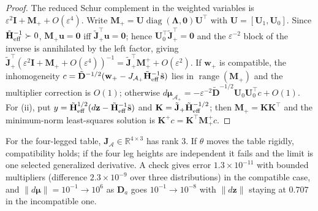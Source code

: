 \begin{proof}
The reduced Schur complement in the weighted variables is $\varepsilon^2\mathbf I+\mathbf M_++O(\varepsilon^4)$. Write $\mathbf M_+=\mathbf U\operatorname{diag}(\boldsymbol\Lambda,\mathbf 0)\mathbf U^\top$ with $\mathbf U=[\mathbf U_1,\mathbf U_0]$. Since $\tilde{\mathbf H}_{\rm eff}^{-1}\succ0$, $\mathbf M_+\mathbf u=\mathbf 0$ iff $\tilde{\mathbf J}_+^\top\mathbf u=\mathbf 0$; hence $\mathbf U_0^\top\tilde{\mathbf J}_+^\top=\mathbf 0$ and the $\varepsilon^{-2}$ block of the inverse is annihilated by the left factor, giving $\tilde{\mathbf J}_+^\top(\varepsilon^2\mathbf I+\mathbf M_++O(\varepsilon^4))^{-1}=\tilde{\mathbf J}_+^\top\mathbf M_+^++O(\varepsilon^2)$. If $\mathbf w_+$ is compatible, the inhomogeneity $c=\tilde{\mathbf D}^{-1/2}(\mathbf w_+-J_{\mathcal A_+}\tilde{\mathbf H}_{\rm eff}^{-1}\tilde{\mathbf s})$ lies in $\operatorname{range}(\mathbf M_+)$ and the multiplier correction is $O(1)$; otherwise $d\boldsymbol\mu_{\mathcal A_+}=-\varepsilon^{-2}\tilde{\mathbf D}^{-1/2}\mathbf U_0\mathbf U_0^\top c+O(1)$. For (ii), put $y=\tilde{\mathbf H}_{\rm eff}^{1/2}(d\mathbf z-\tilde{\mathbf H}_{\rm eff}^{-1}\tilde{\mathbf s})$ and $\mathbf K=\tilde{\mathbf J}_+\tilde{\mathbf H}_{\rm eff}^{-1/2}$; then $\mathbf M_+=\mathbf K\mathbf K^\top$ and the minimum-norm least-squares solution is $\mathbf K^+c=\mathbf K^\top\mathbf M_+^+c$.
\end{proof}
For the four-legged table, $\mathbf J_{\mathcal A}\in\mathbb{R}^{4\times3}$ has rank 3. If $\theta$ moves the table rigidly, compatibility holds; if the four leg heights are independent it fails and the limit is one selected generalized derivative. A check gives error $1.3\times10^{-11}$ with bounded multipliers (difference $2.3\times10^{-9}$ over three distributions) in the compatible case, and $\|d\boldsymbol\mu\|=10^{-1}\to10^{6}$ as $\mathbf D_a$ goes $10^{-1}\to10^{-8}$ with $\|d\mathbf z\|$ staying at $0.707$ in the incompatible one.

